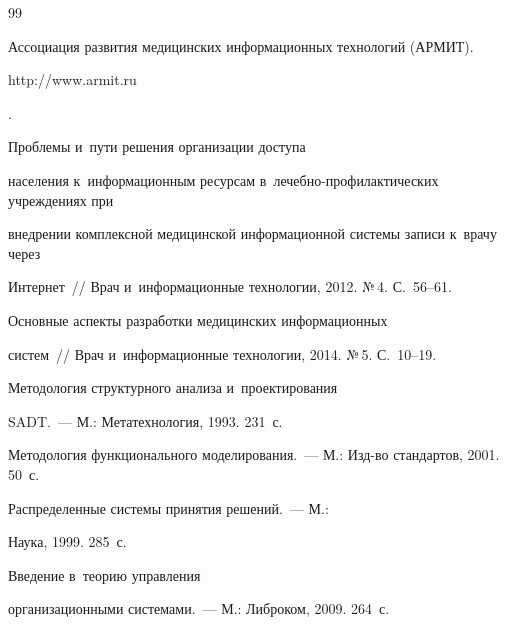 {\small\frenchspacing


{%




\begin{thebibliography}{99}




  Ассоциация развития медицинских информационных технологий (АРМИТ). {\sf 


http://www.armit.ru}.




   Проблемы и~пути решения организации доступа 


населения к~информационным ресурсам в~ле\-чеб\-но-про\-фи\-лак\-ти\-че\-ских учреждениях при 


внедрении комплексной медицинской информационной сис\-те\-мы записи к~врачу через 


Интернет~/\!\!/ Врач и~информационные технологии, 2012. №\,4. С.~56--61.




   Основные аспекты разработки медицинских информационных 


сис\-тем~/\!\!/ Врач и~информационные технологии, 2014. №\,5. С.~10--19.




   Методология структурного анализа и~проектирования 


SADT.~--- М.: Метатехнология, 1993. 231~с. 




  Методология функционального моделирования.~--- М.: Изд-во стандартов, 2001. 50~с. 







   Распределенные сис\-те\-мы принятия решений.~--- М.: 


Наука, 1999. 285~с.




   Введение в~тео\-рию управ\-ле\-ния 


организационными сис\-те\-ма\-ми.~--- М.: Либроком, 2009. 264~с. 








\end{thebibliography}}}
